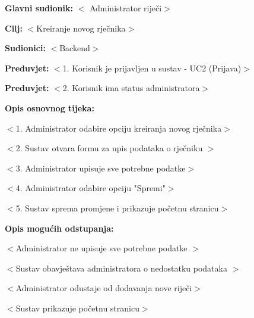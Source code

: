 					\noindent {}
					\begin{packed_item}
						
						\item \textbf{Glavni sudionik: }$<$ Administrator riječi$>$
						\item  \textbf{Cilj:} $<$Kreiranje novog rječnika$>$
						\item  \textbf{Sudionici:} $<$Backend$>$
						\item  \textbf{Preduvjet:} $<$1. Korisnik je prijavljen u sustav - UC2 (Prijava)$>$
						\item  \textbf{Preduvjet:} $<$2. Korisnik ima status administratora$>$
						\item  \textbf{Opis osnovnog tijeka:}
						
						\item[] \begin{packed_enum}
							
							\item $<$1. Administrator odabire opciju kreiranja novog rječnika$>$
							\item $<$2. Sustav otvara formu za upis podataka o rječniku $>$
							\item $<$3. Administrator upisuje sve potrebne podatke$>$
							\item $<$4. Administrator odabire opciju "Spremi"$>$
							\item $<$5. Sustav sprema promjene i prikazuje početnu stranicu$>$
						
						\end{packed_enum}
					
						\item  \textbf{Opis mogućih odstupanja:}
					
						\item[] \begin{packed_item}
						
							\item[3.a] $<$Administrator ne upisuje sve potrebne podatke $>$
							\item[] \begin{packed_enum}
								
								\item $<$Sustav obavještava administratora o nedostatku podataka $>$
								
							\end{packed_enum}	
							
							\item[4.a] $<$Administrator odustaje od dodavanja nove riječi$>$
							\item[] \begin{packed_enum}
								
								\item $<$Sustav prikazuje početnu stranicu$>$
								
							\end{packed_enum}
								\end{packed_item}
						\end{packed_item}
					
